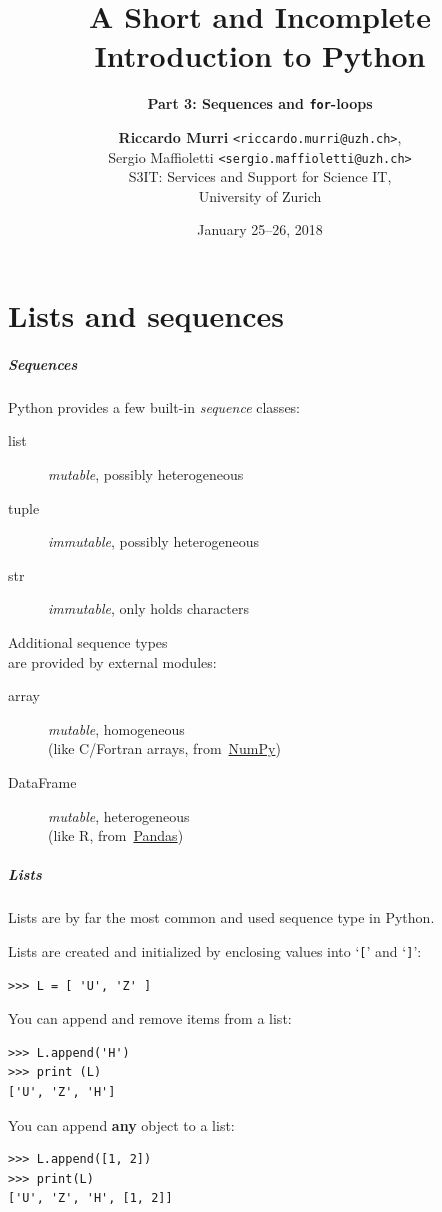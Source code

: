 \documentclass[english,serif,mathserif,xcolor=pdftex,dvipsnames,table]{beamer}
\title[3. Sequences and loops]{%
  A Short and Incomplete Introduction to Python
}
\subtitle{\bfseries Part 3: Sequences and \texttt{for}-loops}
\author[R.~Murri]{%
  \textbf{Riccardo Murri} \texttt{<riccardo.murri@uzh.ch>}, \\
  Sergio Maffioletti \texttt{<sergio.maffioletti@uzh.ch>}
  \\
  S3IT: Services and Support for Science IT,
  \\
  University of Zurich
}
\date{January 25--26, 2018}
\begin{document}
\maketitle


\part{Lists and sequences}

\begin{frame}
  \frametitle{Sequences}

  Python provides a few built-in \emph{sequence} classes:
  \begin{description}
  \item[list] \emph{mutable}, possibly heterogeneous
  \item[tuple] \emph{immutable}, possibly heterogeneous
  \item[str] \emph{immutable}, only holds characters
  \end{description}

  \+
  Additional sequence types \\ are provided by external modules:
  \begin{description}
  \item[array] \emph{mutable}, homogeneous \\ (like C/Fortran arrays,
    from~\href{http://numpy.scipy.org}{NumPy})
  \item[DataFrame] \emph{mutable}, heterogeneous \\ (like R,
    from~\href{http://pandas.pydata.org/}{Pandas})
  \end{description}

\end{frame}


\begin{frame}[fragile]
  \frametitle{Lists}
  Lists are by far the most common and used sequence type in Python.

  \+
  Lists are created and initialized by enclosing values into
  `\texttt{[}' and `\texttt{]}':
\begin{lstlisting}
>>> L = [ 'U', 'Z' ]
\end{lstlisting}

  \+\pause
  You can append and remove items from a list:
\begin{lstlisting}
>>> L.append('H')
>>> print (L)
['U', 'Z', 'H']
\end{lstlisting}

  \+\pause
  You can append \textbf{any} object to a list:
\begin{lstlisting}
>>> L.append([1, 2])
>>> print(L)
['U', 'Z', 'H', [1, 2]]
\end{lstlisting}

\end{frame}
\end{document}
